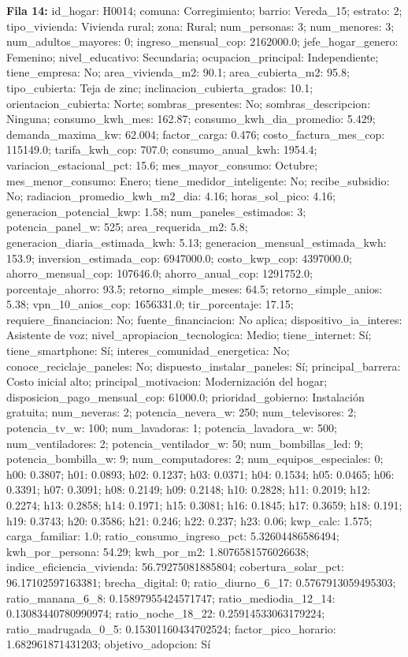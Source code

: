 {\footnotesize\textbf{Fila 14:} id\_hogar: H0014; comuna: Corregimiento; barrio: Vereda\_15; estrato: 2; tipo\_vivienda: Vivienda rural; zona: Rural; num\_personas: 3; num\_menores: 3; num\_adultos\_mayores: 0; ingreso\_mensual\_cop: 2162000.0; jefe\_hogar\_genero: Femenino; nivel\_educativo: Secundaria; ocupacion\_principal: Independiente; tiene\_empresa: No; area\_vivienda\_m2: 90.1; area\_cubierta\_m2: 95.8; tipo\_cubierta: Teja de zinc; inclinacion\_cubierta\_grados: 10.1; orientacion\_cubierta: Norte; sombras\_presentes: No; sombras\_descripcion: Ninguna; consumo\_kwh\_mes: 162.87; consumo\_kwh\_dia\_promedio: 5.429; demanda\_maxima\_kw: 62.004; factor\_carga: 0.476; costo\_factura\_mes\_cop: 115149.0; tarifa\_kwh\_cop: 707.0; consumo\_anual\_kwh: 1954.4; variacion\_estacional\_pct: 15.6; mes\_mayor\_consumo: Octubre; mes\_menor\_consumo: Enero; tiene\_medidor\_inteligente: No; recibe\_subsidio: No; radiacion\_promedio\_kwh\_m2\_dia: 4.16; horas\_sol\_pico: 4.16; generacion\_potencial\_kwp: 1.58; num\_paneles\_estimados: 3; potencia\_panel\_w: 525; area\_requerida\_m2: 5.8; generacion\_diaria\_estimada\_kwh: 5.13; generacion\_mensual\_estimada\_kwh: 153.9; inversion\_estimada\_cop: 6947000.0; costo\_kwp\_cop: 4397000.0; ahorro\_mensual\_cop: 107646.0; ahorro\_anual\_cop: 1291752.0; porcentaje\_ahorro: 93.5; retorno\_simple\_meses: 64.5; retorno\_simple\_anios: 5.38; vpn\_10\_anios\_cop: 1656331.0; tir\_porcentaje: 17.15; requiere\_financiacion: No; fuente\_financiacion: No aplica; dispositivo\_ia\_interes: Asistente de voz; nivel\_apropiacion\_tecnologica: Medio; tiene\_internet: Sí; tiene\_smartphone: Sí; interes\_comunidad\_energetica: No; conoce\_reciclaje\_paneles: No; dispuesto\_instalar\_paneles: Sí; principal\_barrera: Costo inicial alto; principal\_motivacion: Modernización del hogar; disposicion\_pago\_mensual\_cop: 61000.0; prioridad\_gobierno: Instalación gratuita; num\_neveras: 2; potencia\_nevera\_w: 250; num\_televisores: 2; potencia\_tv\_w: 100; num\_lavadoras: 1; potencia\_lavadora\_w: 500; num\_ventiladores: 2; potencia\_ventilador\_w: 50; num\_bombillas\_led: 9; potencia\_bombilla\_w: 9; num\_computadores: 2; num\_equipos\_especiales: 0; h00: 0.3807; h01: 0.0893; h02: 0.1237; h03: 0.0371; h04: 0.1534; h05: 0.0465; h06: 0.3391; h07: 0.3091; h08: 0.2149; h09: 0.2148; h10: 0.2828; h11: 0.2019; h12: 0.2274; h13: 0.2858; h14: 0.1971; h15: 0.3081; h16: 0.1845; h17: 0.3659; h18: 0.191; h19: 0.3743; h20: 0.3586; h21: 0.246; h22: 0.237; h23: 0.06; kwp\_calc: 1.575; carga\_familiar: 1.0; ratio\_consumo\_ingreso\_pct: 5.32604486586494; kwh\_por\_persona: 54.29; kwh\_por\_m2: 1.8076581576026638; indice\_eficiencia\_vivienda: 56.79275081885804; cobertura\_solar\_pct: 96.17102597163381; brecha\_digital: 0; ratio\_diurno\_6\_17: 0.5767913059495303; ratio\_manana\_6\_8: 0.15897955424571747; ratio\_mediodia\_12\_14: 0.13083440780990974; ratio\_noche\_18\_22: 0.25914533063179224; ratio\_madrugada\_0\_5: 0.15301160434702524; factor\_pico\_horario: 1.682961871431203; objetivo\_adopcion: Sí\par}
